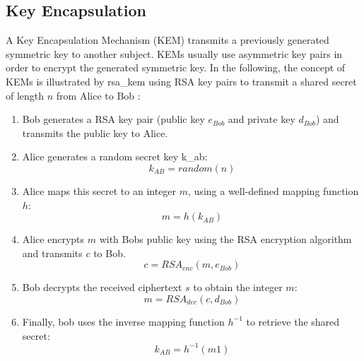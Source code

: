 \subsection{Key Encapsulation}

A Key Encapsulation Mechanism (\gls{KEM}) transmits a previously generated symmetric key to another subject. \glspl{KEM} usually use asymmetric key pairs in order to encrypt the generated symmetric key. In the following, the concept of \glspl{KEM} is illustrated by  \gls{rsa_kem} using \gls{RSA} key pairs to transmit a shared secret of length $n$ from Alice to Bob \parencite{rsakem}:

\begin{enumerate}
\item Bob generates a \gls{RSA} key pair (public key $e_{Bob}$ and private key $d_{Bob}$) and transmits the public key to Alice.
\item Alice generates a random secret key \gls{k_ab}:
\begin{equation*}
k_{AB} = random(n)
\end{equation*}
\item Alice maps this secret to an integer $m$, using a well-defined mapping function $h$:
\begin{equation*}
m = h(k_{AB})
\end{equation*}
\item Alice encrypts $m$ with Bobs public key using the \gls{RSA} encryption algorithm and transmits $c$ to Bob.
\begin{equation*}
c = RSA_{enc}(m, e_{Bob})
\end{equation*}
\item Bob decrypts the received ciphertext $s$ to obtain the integer $m$:
\begin{equation*}
m = RSA_{dec}(c, d_{Bob})
\end{equation*}
\item Finally, bob uses the inverse mapping function $h^{-1}$ to retrieve the shared secret:
\begin{equation*}
k_{AB} = h^{-1}(m1)
\end{equation*}

\end{enumerate}

